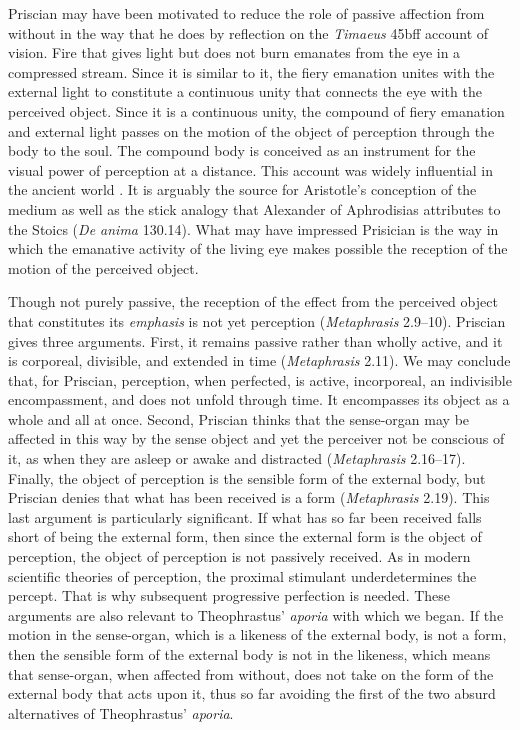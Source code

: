 \documentclass[12pt]{article}
\begin{document}
Priscian may have been motivated to reduce the role of passive affection from without in the way that he does by reflection on the \emph{Timaeus} 45bff account of vision. Fire that gives light but does not burn emanates from the eye in a compressed stream. Since it is similar to it, the fiery emanation unites with the external light to constitute a continuous unity that connects the eye with the perceived object. Since it is a continuous unity, the compound of fiery emanation and external light passes on the motion of the object of perception through the body to the soul. The compound body is conceived as an instrument for the visual power of perception at a distance. This account was widely influential in the ancient world \citep[ch. 1]{Lindberg:1977aa}. It is arguably the source for Aristotle's conception of the medium as well as the stick analogy that Alexander of Aphrodisias attributes to the Stoics (\emph{De anima} 130.14). What may have impressed Prisician is the way in which the emanative activity of the living eye makes possible the reception of the motion of the perceived object.

Though not purely passive, the reception of the effect from the perceived object that constitutes its \emph{emphasis} is not yet perception (\emph{Metaphrasis} 2.9--10). Priscian gives three arguments. First, it remains passive rather than wholly active, and it is corporeal, divisible, and extended in time (\emph{Metaphrasis} 2.11). We may conclude that, for Priscian, perception, when perfected, is active, incorporeal, an indivisible encompassment, and does not unfold through time. It encompasses its object as a whole and all at once. Second, Priscian thinks that the sense-organ may be affected in this way by the sense object and yet the perceiver not be conscious of it, as when they are asleep or awake and distracted (\emph{Metaphrasis} 2.16--17). Finally, the object of perception is the sensible form of the external body, but Priscian denies that what has been received is a form (\emph{Metaphrasis} 2.19). This last argument is particularly significant. If what has so far been received falls short of being the external form, then since the external form is the object of perception, the object of perception is not passively received. As in modern scientific theories of perception, the proximal stimulant underdetermines the percept. That is why subsequent progressive perfection is needed. These arguments are also relevant to Theophrastus' \emph{aporia} with which we began. If the motion in the sense-organ, which is a likeness of the external body, is not a form, then the sensible form of the external body is not in the likeness, which means that sense-organ, when affected from without, does not take on the form of the external body that acts upon it, thus so far avoiding the first of the two absurd alternatives of Theophrastus' \emph{aporia}. 
\end{document}
